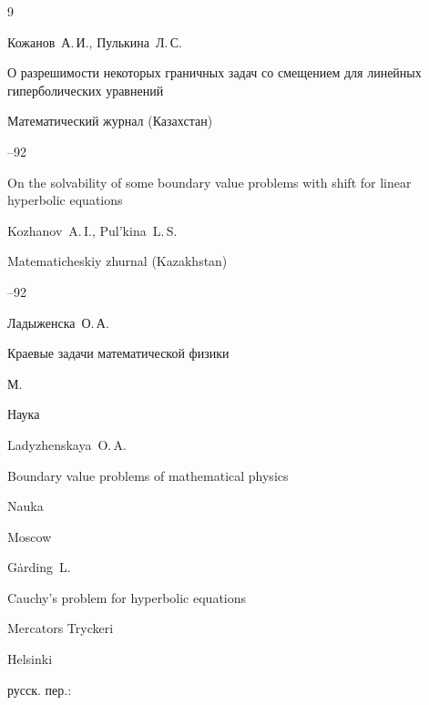 \begin{thebibliography}{9}

\by Кожанов~А.\,И., Пулькина~Л.\,С.

\paper О разрешимости некоторых граничных задач со смещением для линейных гиперболических уравнений

\jour Математический журнал (Казахстан)




--92

\misctransl

\paper On the solvability of some boundary value problems with shift for linear hyperbolic equations

\by Kozhanov~A.\,I., Pul'kina~L.\,S.

\jour Matematicheskiy zhurnal (Kazakhstan)




--92






\by Ладыженска~О.\,А.

\book Краевые задачи математической физики

\publaddr М.

\publ Наука



\misctransl

\by Ladyzhenskaya~O.\,A.

\book Boundary value problems of mathematical physics

\publ Nauka

\publaddr Moscow










\by G\.arding~L.

\book Cauchy's problem for hyperbolic equations

\publ Mercators Tryckeri

\publaddr Helsinki


\rtransl русск. пер.:~


\end{thebibliography}
